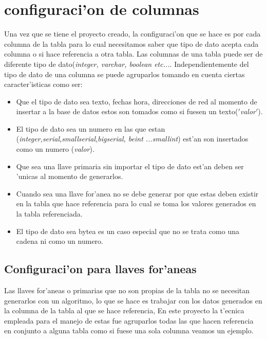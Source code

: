 \section{configuraci'on de columnas}
Una vez que se tiene el proyecto creado, la configuraci'on que se hace es por cada columna de la tabla para lo cual necesitamos saber que tipo de dato acepta cada columna o si hace referencia a otra tabla.
Las columnas de una tabla puede ser de diferente tipo de dato(\textit{integer, varchar, boolean etc...}. Independientemente del tipo de dato de una columna se puede agruparlos tomando en cuenta ciertas caracter'isticas como ser:
\begin{itemize}
\item Que el tipo de dato sea texto, fechas hora, direcciones de red al momento de insertar a la base de datos estos son tomados como si fuesen un texto($'$\textit{valor}$'$).
\item El tipo de dato sea un numero en las que estan (\textit{integer,serial,smallserial,bigserial, beint ...smallint}) est'an son insertados como un numero (\textit{valor}).
\item Que sea una llave primaria sin importar el tipo de dato est'an deben ser 'unicas al momento de generarlos.
\item Cuando sea una llave for'anea no se debe generar por que estas deben existir en la tabla que hace referencia para lo cual se toma los valores generados en la tabla referenciada.
\item El tipo de dato sea bytea es un caso especial que no se trata como una cadena ni como un numero.
\end{itemize}
\subsection{Configuraci'on para llaves for'aneas}
Las llaves for'aneas o primarias que no son propias de la tabla no se necesitan generarlos con un algoritmo, lo que se hace es trabajar con los datos generados en la columna de la tabla al que se hace referencia, En este proyecto la t'ecnica empleada para el manejo de estas fue agruparlos todas las que hacen referencia en conjunto a alguna tabla como si fuese una sola columna veamos un ejemplo.\\

